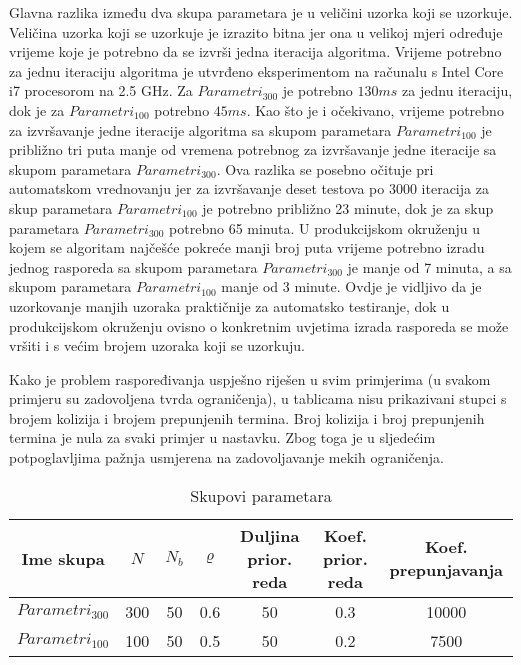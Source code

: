 \documentclass[times, utf8, zavrsni]{fer}
\begin{document}
Glavna razlika
između dva skupa parametara je u veličini uzorka koji se uzorkuje. Veličina uzorka koji se uzorkuje je izrazito bitna jer ona u velikoj mjeri određuje vrijeme koje je potrebno
da se izvrši jedna iteracija algoritma. Vrijeme potrebno za jednu iteraciju algoritma je utvrđeno eksperimentom na računalu s Intel Core i7 procesorom na 2.5 GHz. Za
$Parametri_{300}$ je potrebno $130 ms$ za jednu iteraciju, dok je za $Parametri_{100}$ potrebno $45 ms$. Kao što je i očekivano, vrijeme potrebno za izvršavanje jedne iteracije
algoritma sa skupom parametara $Parametri_{100}$ je približno tri puta manje od vremena potrebnog za izvršavanje jedne iteracije sa skupom parametara $Parametri_{300}$. Ova
razlika se posebno očituje pri automatskom vrednovanju jer za izvršavanje deset testova po $3000$ iteracija za skup parametara $Parametri_{100}$ je potrebno
približno 23 minute, dok je za skup parametara $Parametri_{300}$ potrebno 65 minuta. U produkcijskom okruženju u kojem se algoritam najčešće pokreće manji broj puta
vrijeme potrebno izradu jednog rasporeda sa skupom parametara $Parametri_{300}$ je manje od 7 minuta, a sa skupom parametara $Parametri_{100}$ manje od 3 minute.
Ovdje je vidljivo da je uzorkovanje manjih uzoraka praktičnije za automatsko testiranje, dok u produkcijskom okruženju ovisno o konkretnim uvjetima izrada rasporeda se
može vršiti i s većim brojem uzoraka koji se uzorkuju.


Kako je problem raspoređivanja uspješno riješen u svim primjerima (u svakom primjeru su zadovoljena tvrda ograničenja), u tablicama nisu prikazivani stupci s brojem kolizija
i brojem prepunjenih termina. Broj kolizija i broj prepunjenih termina je nula za svaki primjer u nastavku. Zbog toga je u sljedećim potpoglavljima pažnja usmjerena na
zadovoljavanje mekih ograničenja.


\begin{table}
  \caption{Skupovi parametara}
  \label{tbl:parametri}
  \centering
  \begin{tabular}{c | c | c | c | c | c | c  }
    Ime skupa     &  $N$ & $N_b$ & $\varrho$ & Duljina prior. reda & Koef. prior. reda & Koef. prepunjavanja \\ \hline
    $Parametri_{300}$ & 300 & 50 & 0.6 & 50 & 0.3 & 10000  \\ \hline
    $Parametri_{100}$ & 100 & 50 & 0.5 & 50 & 0.2 & 7500
  \end{tabular}
\end{table}
\end{document}
